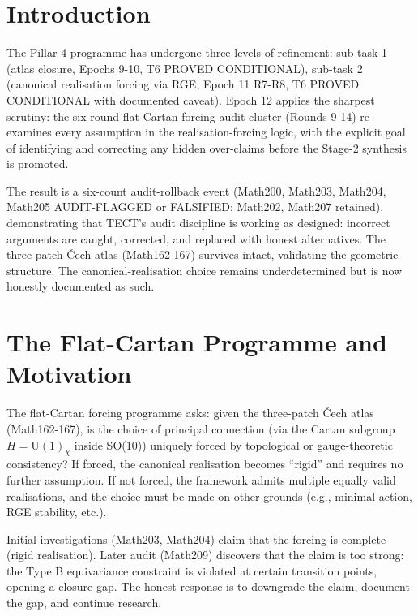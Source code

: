 \maketitle

\section{Introduction}
The Pillar 4 programme has undergone three levels of refinement: sub-task 1 (atlas
closure, Epochs 9-10, T6 PROVED CONDITIONAL), sub-task 2 (canonical realisation
forcing via RGE, Epoch 11 R7-R8, T6 PROVED CONDITIONAL with documented caveat).
Epoch 12 applies the sharpest scrutiny: the six-round flat-Cartan forcing audit
cluster (Rounds 9-14) re-examines every assumption in the realisation-forcing logic,
with the explicit goal of identifying and correcting any hidden over-claims before
the Stage-2 synthesis is promoted.

The result is a six-count audit-rollback event (Math200, Math203, Math204, Math205
AUDIT-FLAGGED or FALSIFIED; Math202, Math207 retained), demonstrating that TECT's
audit discipline is working as designed: incorrect arguments are caught, corrected,
and replaced with honest alternatives. The three-patch Čech atlas (Math162-167)
survives intact, validating the geometric structure. The canonical-realisation
choice remains underdetermined but is now honestly documented as such.

\section{The Flat-Cartan Programme and Motivation}
The flat-Cartan forcing programme asks: given the three-patch Čech atlas
(Math162-167), is the choice of principal connection (via the Cartan subgroup
$H = \mathrm{U}(1)_\chi$ inside SO(10)) uniquely forced by topological or
gauge-theoretic consistency? If forced, the canonical realisation becomes
``rigid'' and requires no further assumption. If not forced, the framework
admits multiple equally valid realisations, and the choice must be made on other
grounds (e.g., minimal action, RGE stability, etc.).

Initial investigations (Math203, Math204) claim that the forcing is complete
(rigid realisation). Later audit (Math209) discovers that the claim is too strong:
the Type B equivariance constraint is violated at certain transition points,
opening a closure gap. The honest response is to downgrade the claim, document
the gap, and continue research.

